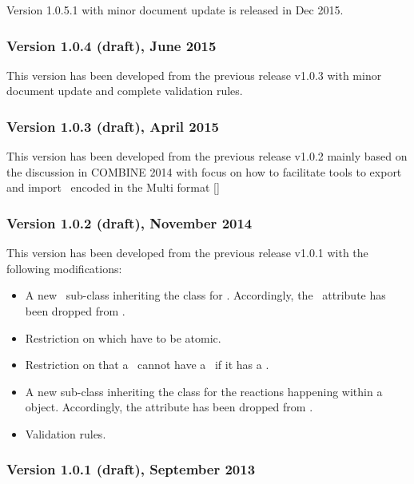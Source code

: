 Version 1.0.5.1 with minor document update is released in Dec 2015.

\subsubsection{Version 1.0.4 (draft), June 2015}
\label{def:v1_0_4}

This version has been developed from the previous release v1.0.3 with minor document update and complete validation rules.

\subsubsection{Version 1.0.3 (draft), April 2015}
\label{def:v1_0_3}

This version has been developed from the previous release v1.0.2 mainly based on the discussion in COMBINE 2014 with focus on how to facilitate tools to export and import \smodels\ encoded in the Multi format [\cite{ref:combine2014}] 

\subsubsection{Version 1.0.2 (draft), November 2014}
\label{def:v1_0_2}

This version has been developed from the previous release v1.0.1 with the following modifications: 

\begin{itemize}
 \item A new \BindingSiteSpeciesType\ sub-class inheriting the \SpeciesType class for . Accordingly, the \isBindingSiteAtt\ attribute has been dropped from \SpeciesType.
 \item Restriction on  which have to be atomic.
 \item Restriction on \SpeciesType that a \speciesType\ cannot have a \listOfSpeciesFeatureTypes\ if it has a \listOfInSpeciesTypeBonds. 
 \item A new \IntraSpeciesReaction sub-class inheriting the \Reaction class for the reactions happening within a \ExSpecies object. Accordingly, the  attribute has been dropped from \Reaction.
 \item Validation rules. 
\end{itemize}

\subsubsection{Version 1.0.1 (draft), September 2013}
\label{def:v1_0_1}

